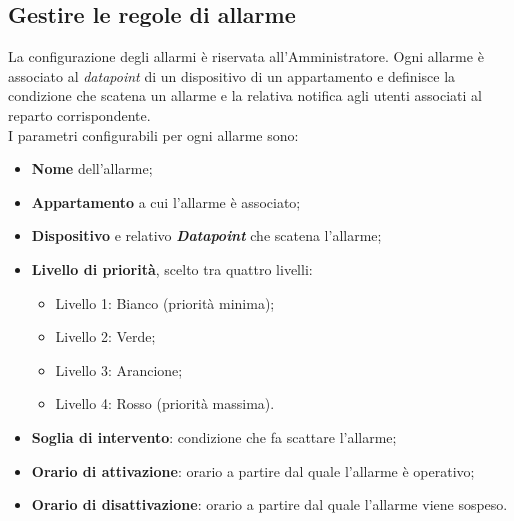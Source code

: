\documentclass[10pt, letterpaper]{article}
\newcommand{\admin}{Amministratore\xspace}
\begin{document}
\subsection{Gestire le regole di allarme}
La configurazione degli allarmi è riservata all'\admin. Ogni allarme è associato
al \textit{datapoint} di un dispositivo di un appartamento e definisce la condizione 
che scatena un allarme e la relativa notifica agli utenti associati al reparto corrispondente.
\\I parametri configurabili per ogni allarme sono:
\begin{itemize}    
    \item \textbf{Nome} dell'allarme;
    \item \textbf{Appartamento} a cui l'allarme è associato;
    \item \textbf{Dispositivo} e relativo \textit{\textbf{Datapoint}} che scatena l'allarme;
    \item \textbf{Livello di priorità}, scelto tra quattro livelli:
          \begin{itemize}    
              \item Livello 1: Bianco (priorità minima);
              \item Livello 2: Verde;
              \item Livello 3: Arancione;
              \item Livello 4: Rosso (priorità massima).
          \end{itemize}
    \item \textbf{Soglia di intervento}: condizione che fa scattare l'allarme;
    \item \textbf{Orario di attivazione}: orario a partire dal quale l'allarme è operativo;
    \item \textbf{Orario di disattivazione}: orario a partire dal quale l'allarme viene sospeso.
\end{itemize}
\end{document}
